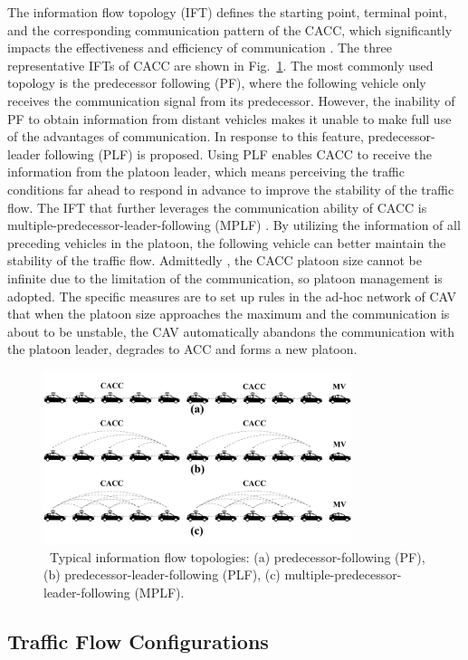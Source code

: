 \documentclass[journal]{IEEEtran}
\begin{document}
The information flow topology (IFT) defines the starting point, terminal point, and the corresponding communication pattern of the CACC, which significantly impacts the effectiveness and efficiency of communication \citep{zheng2015stability}. The three representative IFTs of CACC are shown in Fig.~\ref{Figure1}. The most commonly used topology is the predecessor following (PF), where the following vehicle only receives the communication signal from its predecessor. However, the inability of PF to obtain information from distant vehicles makes it unable to make full use of the advantages of communication. In response to this feature, predecessor-leader following (PLF) is proposed. Using PLF enables CACC to receive the information from the platoon leader, which means perceiving the traffic conditions far ahead to respond in advance to improve the stability of the traffic flow. The IFT that further leverages the communication ability of CACC is multiple-predecessor-leader-following (MPLF) \citep{jia2015survey,ma2020stability}. By utilizing the information of all preceding vehicles in the platoon, the following vehicle can better maintain the stability of the traffic flow. Admittedly , the CACC platoon size cannot be infinite due to the limitation of the communication, so platoon management is adopted. The specific measures are to set up rules in the ad-hoc network of CAV that when the platoon size approaches the maximum and the communication is about to be unstable, the CAV automatically abandons the communication with the platoon leader, degrades to ACC and forms a new platoon.

\begin{figure}
\centering
\includegraphics[width=9cm]{fig1.png}
\caption{~Typical information flow topologies: (a) predecessor-following (PF), (b) predecessor-leader-following (PLF), (c) multiple-predecessor-leader-following (MPLF).} 
\label{Figure1}
\end{figure}


\subsection{Traffic Flow Configurations}
\end{document}

